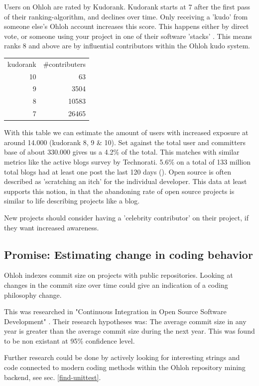 \documentclass{sig-alternate}
\begin{document}
Users on Ohloh are rated by Kudorank. Kudorank starts at 7 after the first pass of their ranking-algorithm, and declines over time. Only receiving a 'kudo' from someone else's Ohloh account increases this score. This happens either by direct vote, or someone using your project in one of their software 'stacks' \cite{ohloh-kudos}. This means ranks 8 and above are by influential contributors within the Ohloh kudo system.

\begin{tabular}{ r r }
  kudorank & \#contributers \\
  10 &    63 \\
  9  &  3504 \\
  8  & 10583 \\
  7  & 26465 \\
\end{tabular}

With this table we can estimate the amount of users with increased exposure at around 14.000 (kudorank 8, 9 \& 10). Set against the total user and committers base of about 330.000 gives us a 4.2\% of the total. This matches with similar metrics like the active blogs survey by Technorati. 5.6\% on a total of 133 million total blogs had at least one post the last 120 days (\cite{blog-state-2008}). Open source is often described as 'scratching an itch' for the individual developer. This data at least supports this notion, in that the abandoning rate of open source projects is similar to life describing projects like a blog. 

New projects should consider having a 'celebrity contributor' on their project, if they want increased awareness.

\subsection{Promise: Estimating change in coding behavior}
Ohloh indexes commit size on projects with public repositories. Looking at changes in the commit size over time could give an indication of a coding philosophy change.

This was researched in "Continuous Integration in 
Open Source Software Development" \cite{Deshpande:2008p4463}. Their research hypotheses was: The average commit size in any year is greater than the average commit size during the next year. This was found to be non existant at 95\% confidence level.

Further research could be done by actively looking for interesting strings and code connected to modern coding methods within the Ohloh repository mining backend, see sec. \ref{find-unittest}.
\end{document}
